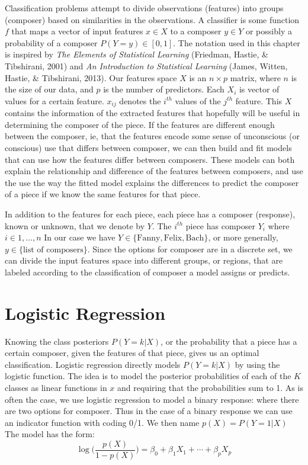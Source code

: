 \documentclass[12pt,twoside]{reedthesis}
\theoremstyle{definition}
\theoremstyle{definition}
\theoremstyle{definition}
\theoremstyle{remark}
\begin{document}
Classification problems attempt to divide observations (features) into
groups (composer) based on similarities in the observations. A
classifier is some function \(f\) that maps a vector of input features
\(x \in X\) to a composer \(y \in Y\) or possibly a probability of a
composer \(P(Y = y) \in [0,1]\). The notation used in this chapter is
inspired by \emph{The Elements of Statistical Learning} (Friedman,
Hastie, \& Tibshirani, 2001) and \emph{An Introduction to Statistical
Learning} (James, Witten, Hastie, \& Tibshirani, 2013). Our features
space \(X\) is an \(n \times p\) matrix, where \(n\) is the size of our
data, and \(p\) is the number of predictors. Each \(X_i\) is vector of
values for a certain feature. \(x_{ij}\) denotes the \(i^{th}\) values
of the \(j^{th}\) feature. This \(X\) contains the information of the
extracted features that hopefully will be useful in determining the
composer of the piece. If the features are different enough between the
composer, ie, that the features encode some sense of unconscious (or
conscious) use that differs between composer, we can then build and fit
models that can use how the features differ between composers. These
models can both explain the relationship and difference of the features
between composers, and use the use the way the fitted model explains the
differences to predict the composer of a piece if we know the same
features for that piece.

In addition to the features for each piece, each piece has a composer
(response), known or unknown, that we denote by \(Y\). The \(i^{th}\)
piece has composer \(Y_i\) where \(i \in 1, \ldots, n\) In our case we
have \(Y \in \{\text{Fanny},\text{Felix}, \text{Bach}\}\), or more
generally, \(y \in \{\text{list of composers}\}\). Since the options for
composer are in a discrete set, we can divide the input features space
into different groups, or regions, that are labeled according to the
classification of composer a model assigns or predicts.

\section{Logistic Regression}\label{logistic-regression}

Knowing the class posteriors \(P(Y = k|X)\), or the probability that a
piece has a certain composer, given the features of that piece, gives us
an optimal classification. Logistic regression directly models
\(P(Y = k|X)\) by using the logistic function. The idea is to model the
posterior probabilities of each of the \(K\) classes as linear functions
in \(x\) and requiring that the probabilities sum to 1. As is often the
case, we use logistic regression to model a binary response: where there
are two options for composer. Thus in the case of a binary response we
can use an indicator function with coding 0/1. We then name
\(p(X) = P(Y=1|X)\) The model has the form:
\[ \log \bigg( \frac{p(X)}{1-p(X)} \bigg) = \beta_0 + \beta_1 X_1 + \cdots + \beta_pX_p\]
\end{document}
